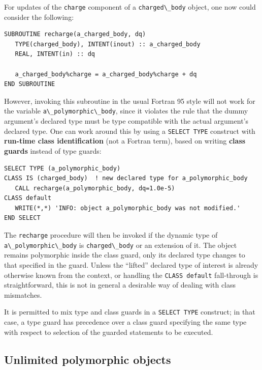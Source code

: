 \documentclass[
  paper=a4,
  ,captions=tableheading
]{scrartcl}
\newcommand{\passthrough}[1]{#1}
\begin{document}
For updates of the \passthrough{\lstinline!charge!} component of a
\passthrough{\lstinline!charged\_body!} object, one now could consider
the following:

\begin{lstlisting}
SUBROUTINE recharge(a_charged_body, dq)
   TYPE(charged_body), INTENT(inout) :: a_charged_body
   REAL, INTENT(in) :: dq

   a_charged_body%charge = a_charged_body%charge + dq
END SUBROUTINE
\end{lstlisting}

However, invoking this subroutine in the usual Fortran 95 style will not
work for the variable \passthrough{\lstinline!a\_polymorphic\_body!},
since it violates the rule that the dummy argument's declared type must
be type compatible with the actual argument's declared type. One can
work around this by using a \passthrough{\lstinline!SELECT TYPE!}
construct with \textbf{run-time class identification} (not a Fortran
term), based on writing \textbf{class guards} instead of type guards:

\begin{lstlisting}
SELECT TYPE (a_polymorphic_body)
CLASS IS (charged_body)  ! new declared type for a_polymorphic_body
   CALL recharge(a_polymorphic_body, dq=1.0e-5)
CLASS default
   WRITE(*,*) 'INFO: object a_polymorphic_body was not modified.'
END SELECT
\end{lstlisting}

The \passthrough{\lstinline!recharge!} procedure will then be invoked if
the dynamic type of \passthrough{\lstinline!a\_polymorphic\_body!} is
\passthrough{\lstinline!charged\_body!} or an extension of it. The
object remains polymorphic inside the class guard, only its declared
type changes to that specified in the guard. Unless the ``lifted''
declared type of interest is already otherwise known from the context,
or handling the \passthrough{\lstinline!CLASS default!} fall-through is
straightforward, this is not in general a desirable way of dealing with
class mismatches.

It is permitted to mix type and class guards in a
\passthrough{\lstinline!SELECT TYPE!} construct; in that case, a type
guard has precedence over a class guard specifying the same type with
respect to selection of the guarded statements to be executed.

\subsection{Unlimited polymorphic
objects}\label{unlimited-polymorphic-objects}
\end{document}
